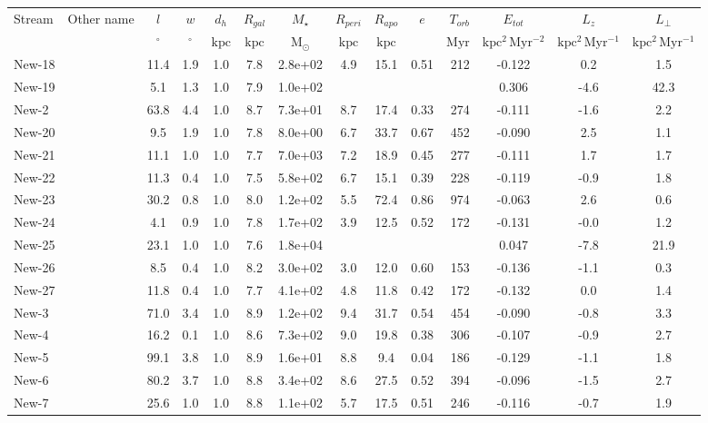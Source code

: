 \centering
\begin{tabular}{llSSSSSSSSrSSS}
\hline\hline
Stream & Other name & $l$ & $w$ & {$d_{h}$} & $R_{gal}$ & $M_\star$ & $R_{peri}$ & $R_{apo}$ & {$e$} & {$T_{orb}$} & {$E_{tot}$} & $L_z$ & $L_\perp$ \\
 &  & $\mathrm{{}^{\circ}}$ & $\mathrm{{}^{\circ}}$ & $\mathrm{kpc}$ & $\mathrm{kpc}$ & $\mathrm{M_{\odot}}$ & $\mathrm{kpc}$ & $\mathrm{kpc}$ &  & $\mathrm{Myr}$ & $\mathrm{kpc^{2}\,Myr^{-2}}$ & $\mathrm{kpc^{2}\,Myr^{-1}}$ & $\mathrm{kpc^{2}\,Myr^{-1}}$ \\
\hline
New-18 &  & 11.4 & 1.9 & 1.0 & 7.8 & 2.8e+02 & 4.9 & 15.1 & 0.51 & 212 & -0.122 & 0.2 & 1.5 \\
New-19 &  & 5.1 & 1.3 & 1.0 & 7.9 & 1.0e+02 &  &  &  &  & 0.306 & -4.6 & 42.3 \\
New-2 &  & 63.8 & 4.4 & 1.0 & 8.7 & 7.3e+01 & 8.7 & 17.4 & 0.33 & 274 & -0.111 & -1.6 & 2.2 \\
New-20 &  & 9.5 & 1.9 & 1.0 & 7.8 & 8.0e+00 & 6.7 & 33.7 & 0.67 & 452 & -0.090 & 2.5 & 1.1 \\
New-21 &  & 11.1 & 1.0 & 1.0 & 7.7 & 7.0e+03 & 7.2 & 18.9 & 0.45 & 277 & -0.111 & 1.7 & 1.7 \\
New-22 &  & 11.3 & 0.4 & 1.0 & 7.5 & 5.8e+02 & 6.7 & 15.1 & 0.39 & 228 & -0.119 & -0.9 & 1.8 \\
New-23 &  & 30.2 & 0.8 & 1.0 & 8.0 & 1.2e+02 & 5.5 & 72.4 & 0.86 & 974 & -0.063 & 2.6 & 0.6 \\
New-24 &  & 4.1 & 0.9 & 1.0 & 7.8 & 1.7e+02 & 3.9 & 12.5 & 0.52 & 172 & -0.131 & -0.0 & 1.2 \\
New-25 &  & 23.1 & 1.0 & 1.0 & 7.6 & 1.8e+04 &  &  &  &  & 0.047 & -7.8 & 21.9 \\
New-26 &  & 8.5 & 0.4 & 1.0 & 8.2 & 3.0e+02 & 3.0 & 12.0 & 0.60 & 153 & -0.136 & -1.1 & 0.3 \\
New-27 &  & 11.8 & 0.4 & 1.0 & 7.7 & 4.1e+02 & 4.8 & 11.8 & 0.42 & 172 & -0.132 & 0.0 & 1.4 \\
New-3 &  & 71.0 & 3.4 & 1.0 & 8.9 & 1.2e+02 & 9.4 & 31.7 & 0.54 & 454 & -0.090 & -0.8 & 3.3 \\
New-4 &  & 16.2 & 0.1 & 1.0 & 8.6 & 7.3e+02 & 9.0 & 19.8 & 0.38 & 306 & -0.107 & -0.9 & 2.7 \\
New-5 &  & 99.1 & 3.8 & 1.0 & 8.9 & 1.6e+01 & 8.8 & 9.4 & 0.04 & 186 & -0.129 & -1.1 & 1.8 \\
New-6 &  & 80.2 & 3.7 & 1.0 & 8.8 & 3.4e+02 & 8.6 & 27.5 & 0.52 & 394 & -0.096 & -1.5 & 2.7 \\
New-7 &  & 25.6 & 1.0 & 1.0 & 8.8 & 1.1e+02 & 5.7 & 17.5 & 0.51 & 246 & -0.116 & -0.7 & 1.9 \\

\end{tabular}
